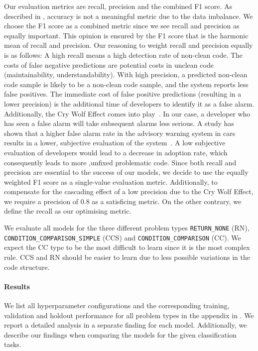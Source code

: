 Our evaluation metrics are recall, precision and the combined F1 score. As described in , accuracy is not a meaningful metric due to the data imbalance. We choose the F1 score as a combined metric since we see recall and precision as equally important. This opinion is ensured by the F1 score that is the harmonic mean of recall and precision.
Our reasoning to weight recall and precision equally is as follows:
A high recall means a high detection rate of non-clean code. The costs of false negative predictions are potential costs in unclean code (maintainability, understandability). With high precision, a predicted non-clean code sample is likely to be a non-clean code sample, and the system reports less false positives. The immediate cost of false positive predictions (resulting in a lower precision) is the additional time of developers to identify it as a false alarm.
Additionally, the Cry Wolf Effect comes into play~\cite{breznitz_cry_1984}. In our case, a developer who has seen a false alarm will take subsequent alarms less serious. A study has shown that a higher false alarm rate in the advisory warning system in cars results in a lower, subjective evaluation of the system~\cite{naujoks_cooperative_2016}. A low subjective evaluation of developers would lead to a decrease in adoption rate, which consequently leads to more ,unfixed problematic code. Since both recall and precision are essential to the success of our models, we decide to use the equally weighted F1 score as a single-value evaluation metric.
Additionally, to compensate for the cascading effect of a low precision due to the Cry Wolf Effect, we require a precision of 0.8 as a satisficing metric. On the other contrary, we define the recall as our optimising metric. 

We evaluate all models for the three different problem types \texttt{RETURN\_NONE} (RN), \texttt{CONDITION\_COMPARISON\_SIMPLE} (CCS) and \texttt{CONDITION\_COMPARISON} (CC). We expect the CC type to be the most difficult to learn since it is the most complex rule. CCS and RN should be easier to learn due to less possible variations in the code structure.

\paragraph{Results}
We list all hyperparameter configurations and the corresponding training, validation and holdout performance for all problem types in the appendix in . We report a detailed analysis in a separate finding for each model. Additionally, we describe our findings when comparing the models for the given classification tasks.



